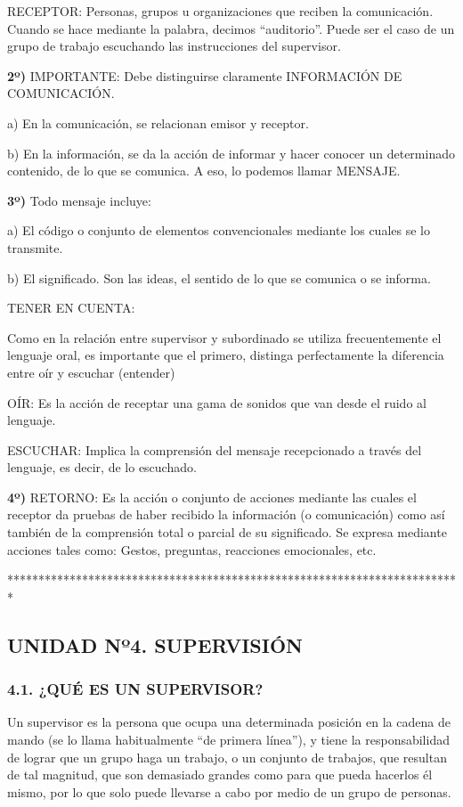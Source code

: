 
RECEPTOR: Personas, grupos u organizaciones que reciben la comunicación. Cuando se hace mediante la palabra, decimos “auditorio”. Puede ser el caso de un grupo de trabajo escuchando las instrucciones del supervisor.

\textbf{2º) }IMPORTANTE: Debe distinguirse claramente INFORMACIÓN DE COMUNICACIÓN.

a) En la comunicación, se relacionan emisor y receptor.

b) En la información, se da la acción de informar y hacer conocer un determinado contenido, de lo que se comunica. A eso, lo podemos llamar MENSAJE.

\textbf{3º) }Todo mensaje incluye:

a) El código o conjunto de elementos convencionales mediante los cuales se lo transmite.

b) El significado. Son las ideas, el sentido de lo que se comunica o se informa.

TENER EN CUENTA:

Como en la relación entre supervisor y subordinado se utiliza frecuentemente el lenguaje oral, es importante que el primero, distinga perfectamente la diferencia entre oír y escuchar (entender)

OÍR: Es la acción de receptar una gama de sonidos que van desde el ruido al lenguaje.

ESCUCHAR: Implica la comprensión del mensaje recepcionado a través del lenguaje, es decir, de lo escuchado.

\textbf{4º) }RETORNO: Es la acción o conjunto de acciones mediante las cuales el receptor da pruebas de haber recibido la información (o comunicación) como así también de la comprensión total o parcial de su significado. Se expresa mediante acciones tales como: Gestos, preguntas, reacciones emocionales, etc.

*************************************************************************



\subsection*{UNIDAD Nº4. SUPERVISIÓN}
\subsubsection*{4.1. ¿QUÉ ES UN SUPERVISOR?}
Un supervisor es la persona que ocupa una determinada posición en la cadena de mando (se lo llama habitualmente “de primera línea”), y tiene la responsabilidad de lograr que un grupo haga un trabajo, o un conjunto de trabajos, que resultan de tal magnitud, que son demasiado grandes como para que pueda hacerlos él mismo, por lo que solo puede llevarse a cabo por medio de un grupo de personas.

